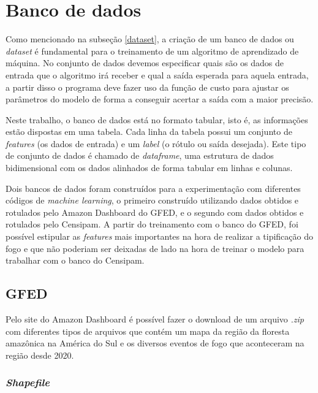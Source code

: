 \chapter{Banco de dados}
\label{banco}


Como mencionado na subseção \ref{dataset}, a criação de um banco de dados ou \textit{dataset} é fundamental para o treinamento de um algoritmo de aprendizado de máquina. No conjunto de dados devemos especificar quais são os dados de entrada que o algoritmo irá receber e qual a saída esperada para aquela entrada, a partir disso o programa deve fazer uso da função de custo para ajustar os parâmetros do modelo de forma a conseguir acertar a saída com a maior precisão.

Neste trabalho, o banco de dados está no formato tabular, isto é, as informações estão dispostas em uma tabela. Cada linha da tabela possui um conjunto de \textit{features} (os dados de entrada) e um \textit{label} (o rótulo ou saída desejada). Este tipo de conjunto de dados é chamado de \textit{dataframe}, uma estrutura de dados bidimensional com os dados alinhados de forma tabular em linhas e colunas.

Dois bancos de dados foram construídos para a experimentação com diferentes códigos de \textit{machine learning}, o primeiro construído utilizando dados obtidos e rotulados pelo Amazon Dashboard do GFED, e o segundo com dados obtidos e rotulados pelo Censipam. A partir do treinamento com o banco do GFED, foi possível estipular as \textit{features} mais importantes na hora de realizar a tipificação do fogo e que não poderiam ser deixadas de lado na hora de treinar o modelo para trabalhar com o banco do Censipam.

\section{GFED}

Pelo site do Amazon Dashboard é possível fazer o download de um arquivo \textit{.zip} com diferentes tipos de arquivos que contém um mapa da região da floresta amazônica na América do Sul e os diversos eventos de fogo que aconteceram na região desde 2020.
\subsection{\textit{Shapefile}}
\label{sec:shp}

